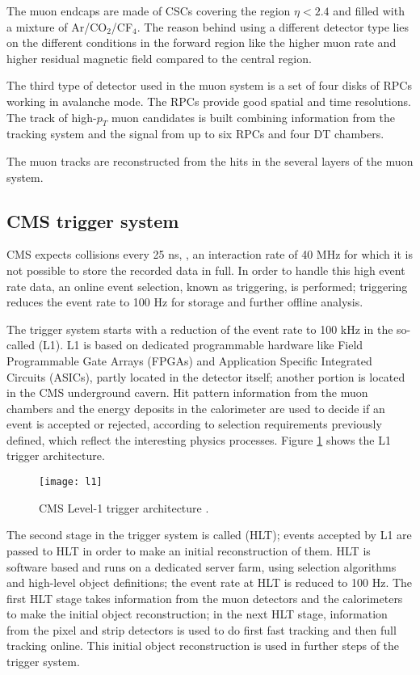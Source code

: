 The muon endcaps are made of CSCs covering the region $\eta< 2.4$ and filled with a mixture of Ar/CO$_2$/CF$_4$. The reason behind using a different detector type lies on the different conditions in the forward region like the higher muon rate and higher residual magnetic field compared to the central region.

The third type of detector used in the muon system is a set of four disks of RPCs working in avalanche mode. The RPCs provide good spatial and time resolutions. The track of high-$p_T$ muon candidates is built combining information from the tracking system and the signal from up to six RPCs and four DT chambers.

The muon tracks are reconstructed from the hits in the several layers of the muon system. 

\subsection{CMS trigger system}

CMS expects \pp collisions every 25 ns, \ie, an interaction rate of 40 MHz for which it is not possible to store the recorded data in full. In order to handle this high event rate data, an online event selection, known as triggering, is performed; triggering reduces the event rate to 100 Hz for storage and further offline analysis.        

The trigger system starts with a reduction of the event rate to 100 kHz in the so-called  (L1). L1 is based on dedicated programmable hardware like Field Programmable Gate Arrays (FPGAs) and Application Specific Integrated Circuits (ASICs), partly located in the detector itself; another portion is located in the CMS underground cavern. Hit pattern information from the muon chambers and the energy deposits in the calorimeter are used to decide if an event is accepted or rejected, according to selection requirements previously defined, which reflect the interesting physics processes. Figure \ref{fig:l1} shows the L1 trigger architecture.

\begin{figure}[h!]
  \centering
  \texttt{[image: l1]}
  \caption[CMS Level-1 trigger architecture]{CMS Level-1 trigger architecture \cite{l1}. }
  \label{fig:l1}
\end{figure}

The second stage in the trigger system is called  (HLT); events accepted by L1 are passed to HLT in order to make an initial reconstruction of them. HLT is software based and runs on a dedicated server farm, using selection algorithms and high-level object definitions; the event rate at HLT is reduced to 100 Hz. The first HLT stage takes information from the muon detectors and the calorimeters to make the initial object reconstruction; in the next HLT stage, information from the pixel and strip detectors is used to do first fast tracking and then full tracking online. This initial object reconstruction is used in further steps of the trigger system.

